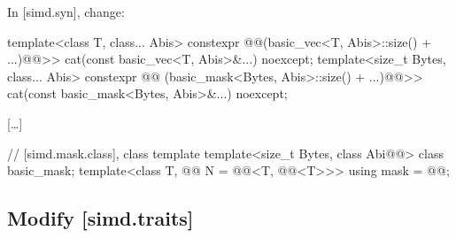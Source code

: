 In [simd.syn], change:
\begin{wgText}
\begin{codeblock}
  template<class T, class... Abis>
    constexpr @@(basic_vec<T, Abis>::size() + ...)@@>>
      cat(const basic_vec<T, Abis>&...) noexcept;
  template<size_t Bytes, class... Abis>
    constexpr @@
                              (basic_mask<Bytes, Abis>::size() + ...)@@>>
      cat(const basic_mask<Bytes, Abis>&...) noexcept;

\end{codeblock}

  [\ldots]

\begin{codeblock}

  // [simd.mask.class], class template 
  template<size_t Bytes, class Abi@@> class basic_mask;
  template<class T, @@ N = @@<T, @@<T>>>
    using mask = @@;
\end{codeblock}
\end{wgText}

\subsection{Modify [simd.traits]}

